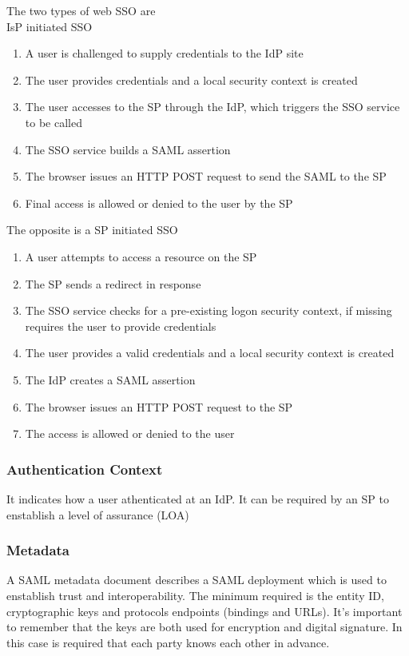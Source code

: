 \documentclass[12pt, a4paper]{article}
\begin{document}
The two types of web SSO are \\ IsP initiated SSO
\begin{enumerate}
    \item A user is challenged to supply credentials to the IdP site
    \item The user provides credentials and a local security context is created
    \item The user accesses to the SP through the IdP, which triggers the SSO service to be called
    \item The SSO service builds a SAML assertion
    \item The browser issues an HTTP POST request to send the SAML to the SP
    \item Final access is allowed or denied to the user by the SP
\end{enumerate}

The opposite is a SP initiated SSO
\begin{enumerate}
    \item A user attempts to access a resource on the SP
    \item The SP sends a redirect in response 
    \item The SSO service checks for a pre-existing logon security context, if missing requires the user to
    provide credentials
    \item The user provides a valid credentials and a local security context is created
    \item The IdP creates a SAML assertion 
    \item The browser issues an HTTP POST request to the SP
    \item The access is allowed or denied to the user
\end{enumerate}

\subsubsection{Authentication Context}
It indicates how a user athenticated at an IdP. It can be required by an SP to enstablish a level of assurance
(LOA)

\subsubsection{Metadata}
A SAML metadata document describes a SAML deployment which is used to enstablish trust and interoperability.
The minimum required is the entity ID, cryptographic keys and protocols endpoints (bindings and URLs). It's 
important to remember that the keys are both used for encryption and digital signature. In this case is 
required that each party knows each other in advance.
\end{document}
